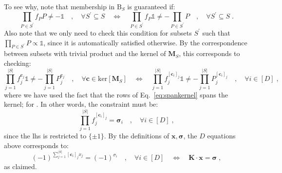 \documentclass[10pt,aps,pra,twocolumn,floatfix,nofootinbib,superscriptaddress,longbibliography]{revtex4-2}
\newcommand{\1}{\mathbbm{1}}
\begin{document}
    To see why, note that membership in $\mathrm B_S$ is guaranteed if:
    \begin{equation}
        \prod_{P \in S^\prime} f_P P \neq -\mathds 1 \quad, \quad \forall S^\prime \subseteq S \quad \Leftrightarrow \quad \prod_{P \in S^\prime} f_P\mathds{1}  \neq -\prod_{P \in S^\prime} P \quad, \quad \forall S^\prime \subseteq S\;.
    \end{equation}
    Also note that we only need to check this condition for subsets $S^\prime$ such that $\prod_{P \in S^\prime} P \propto \mathds 1$, since it is automatically satisfied otherwise. By the correspondence between subsets with trivial product and the kernel of $\mathbf M_S$, this corresponds to checking:
    \begin{equation}
        \prod_{j=1}^{|S|} f_j^{\mathbf c_j}\mathds{1}  \neq -\prod_{j=1}^{|S|} P_j^{\mathbf c_j} \quad, \quad \forall \mathbf c \in \mathrm{ker}[\mathbf M_S] \quad \Leftrightarrow \quad \prod_{j=1}^{|S|} f_j^{[\mathbf c_i]_j}  \mathds{1}\neq -\prod_{j=1}^{|S|} P_j^{[\mathbf c_i]_j} \quad, \quad \forall i \in [D]\;,
    \end{equation}
    where we have used the fact that the rows of Eq.~\eqref{eq:spankernel} spans the kernel; for . In other words, the constraint must be:
    \begin{equation}
        \prod_{j=1}^{|S|}f_j^{[\mathbf c_i]_j} = \boldsymbol{\sigma}_i\quad, \quad \forall i \in [D]\;,
    \end{equation}
    since the lhs is restricted to $\{\pm1\}$. By the definitions of $\mathbf x, \boldsymbol{\sigma}$, the $D$ equations above corresponds to:
    \begin{equation}
        (-1)^{\sum_{j=1}^{|S|}[\mathbf c_i]_j x_j} = (-1)^{\sigma_i} \quad, \quad \forall i \in [D] \quad \Leftrightarrow \quad \mathbf K \cdot \mathbf x =\boldsymbol{\sigma}\;,
    \end{equation}
    as claimed.
\end{document}

